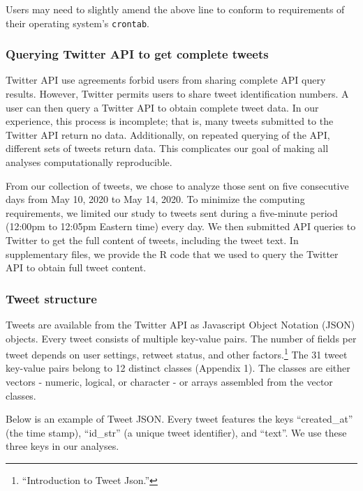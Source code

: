 \documentclass[
]{article}
\begin{document}
Users may need to slightly amend the above line to conform to
requirements of their operating system's \texttt{crontab}.

\hypertarget{querying-twitter-api-to-get-complete-tweets}{%
\subsubsection{Querying Twitter API to get complete
tweets}\label{querying-twitter-api-to-get-complete-tweets}}

Twitter API use agreements forbid users from sharing complete API query
results. However, Twitter permits users to share tweet identification
numbers. A user can then query a Twitter API to obtain complete tweet
data. In our experience, this process is incomplete; that is, many
tweets submitted to the Twitter API return no data. Additionally, on
repeated querying of the API, different sets of tweets return data. This
complicates our goal of making all analyses computationally
reproducible.

From our collection of tweets, we chose to analyze those sent on five
consecutive days from May 10, 2020 to May 14, 2020. To minimize the
computing requirements, we limited our study to tweets sent during a
five-minute period (12:00pm to 12:05pm Eastern time) every day. We then
submitted API queries to Twitter to get the full content of tweets,
including the tweet text. In supplementary files, we provide the R code
that we used to query the Twitter API to obtain full tweet content.

\hypertarget{tweet-structure}{%
\subsubsection{Tweet structure}\label{tweet-structure}}

Tweets are available from the Twitter API as Javascript Object Notation
(JSON) objects. Every tweet consists of multiple key-value pairs. The
number of fields per tweet depends on user settings, retweet status, and
other factors.\footnote{``Introduction to Tweet Json.''} The 31 tweet
key-value pairs belong to 12 distinct classes (Appendix 1). The classes
are either vectors - numeric, logical, or character - or arrays
assembled from the vector classes.

Below is an example of Tweet JSON. Every tweet features the keys
``created\_at'' (the time stamp), ``id\_str'' (a unique tweet
identifier), and ``text''. We use these three keys in our analyses.
\end{document}
